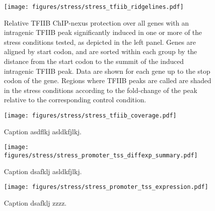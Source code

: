 


\begin{sidewaysfigure}
    \texttt{[image: figures/stress/stress\_tfiib\_ridgelines.pdf]}
    \caption[TFIIB ChIP-nexus protection over all genes with stress-induced intragenic TFIIB peaks.]{Relative TFIIB ChIP-nexus protection over all genes with an intragenic TFIIB peak significantly induced in one or more of the stress conditions tested, as depicted in the left panel. Genes are aligned by start codon, and are sorted within each group by the distance from the start codon to the summit of the induced intragenic TFIIB peak. Data are shown for each gene up to the stop codon of the gene. Regions where TFIIB peaks are called are shaded in the stress conditions according to the fold-change of the peak relative to the corresponding control condition.}
    \label{fig:stress_tfiib_ridgelines}
\end{sidewaysfigure}

\begin{figure}
\texttt{[image: figures/stress/stress\_tfiib\_coverage.pdf]}
\label{fig:stress_tfiib_coverage}
\caption[TFIIB ChIP-nexus protection over four genes with stress-induced intragenic TFIIB peaks.]{Caption asdflkj asldkfjlkj.}
\end{figure}

\begin{figure}
\texttt{[image: figures/stress/stress\_promoter\_tss\_diffexp\_summary.pdf]}
\caption[Bar plot of the number of promoters from various genomic classes differentially expressed in oxidative stress.]{Caption dsafklj asldkfjlkj.}
\label{fig:stress_promoter_tss_diffexp_summary}
\end{figure}

\begin{figure}
\texttt{[image: figures/stress/stress\_promoter\_tss\_expression.pdf]}
\caption[TSS-seq expression levels in oxidative stress of oxidative-stress-induced genic and intragenic promoters.]{Caption dsafklj zzzz.}
\label{fig:stress_promoter_tss_diffexp_summary}
\end{figure}

